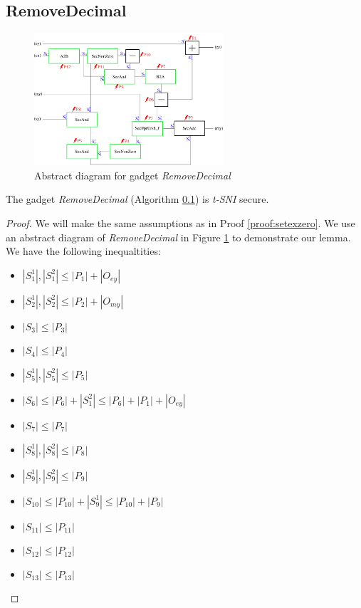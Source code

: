 \documentclass[runningheads]{llncs}
\begin{document}
\subsection{RemoveDecimal}
\label{alg:removedecimal}
\begin{figure}[!ht]
    \includegraphics[width=7cm]{figure/RemoveDec.pdf}
    \caption{Abstract diagram for gadget \emph{RemoveDecimal}}
    \label{fig:removedecimal}
\end{figure}
\begin{lemma}\label{lem:removedecimal}
    The gadget \emph{RemoveDecimal} (Algorithm \ref{alg:removedecimal}) is \emph{t-SNI} secure.    
\end{lemma}
\begin{proof}
    We will make the same assumptions as in Proof \ref{proof:setexzero}. We use an abstract diagram of \emph{RemoveDecimal} in Figure \ref{fig:removedecimal} to demonstrate our lemma. We have the following inequaltities:
    \begin{multicols}{2}
        \begin{itemize}
            \item $|S_1^1|,|S_1^2|\leq|P_1| + |O_{ey}|$
            \item $|S_2^1|,|S_2^2|\leq|P_2| + |O_{my}|$
            \item $|S_3|\leq |P_3|$
            \item $|S_4|\leq|P_4|$
            \item $|S_5^1|,|S_5^2| \leq |P_5|$
            \item $|S_6| \leq |P_6| + |S_1^2| \leq |P_6| + |P_1| + |O_{ey}|$
            \item $|S_7|\leq|P_7|$
            \item $|S_8^1|,|S_8^2|\leq|P_8|$
            \item $|S_9^1|,|S_9^2| \leq|P_9|$
            \item $|S_10|\leq|P_10| + |S_9^1| \leq |P_10| + |P_9|$
            \item $|S_11| \leq |P_11|$
            \item $|S_12| \leq |P_12|$
            \item $|S_13| \leq |P_13|$
        \end{itemize}
    \end{multicols}
    
\end{proof}
\end{document}
